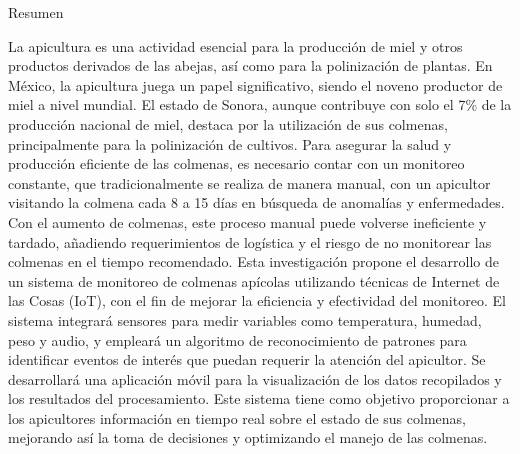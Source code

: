 \begin{center}
\large{Resumen}
\end{center}

    La apicultura es una actividad esencial para la producción de miel y otros productos derivados de las abejas, así como para la polinización de plantas. En México, la apicultura juega un papel significativo, siendo el noveno productor de miel a nivel mundial. El estado de Sonora, aunque contribuye con solo el 7\% de la producción nacional de miel, destaca por la utilización de sus colmenas, principalmente para la polinización de cultivos. Para asegurar la salud y producción eficiente de las colmenas, es necesario contar con un monitoreo constante, que tradicionalmente se realiza de manera manual, con un apicultor visitando la colmena cada 8 a 15 días en búsqueda de anomalías y enfermedades. Con el aumento de colmenas, este proceso manual puede volverse ineficiente y tardado, añadiendo requerimientos de logística y el riesgo de no monitorear las colmenas en el tiempo recomendado. Esta investigación propone el desarrollo de un sistema de monitoreo de colmenas apícolas utilizando técnicas de Internet de las Cosas (IoT), con el fin de mejorar la eficiencia y efectividad del monitoreo. El sistema integrará sensores para medir variables como temperatura, humedad, peso y audio, y empleará un algoritmo de reconocimiento de patrones para identificar eventos de interés que puedan requerir la atención del apicultor. Se desarrollará una aplicación móvil para la visualización de los datos recopilados y los resultados del procesamiento. Este sistema tiene como objetivo proporcionar a los apicultores información en tiempo real sobre el estado de sus colmenas, mejorando así la toma de decisiones y optimizando el manejo de las colmenas.